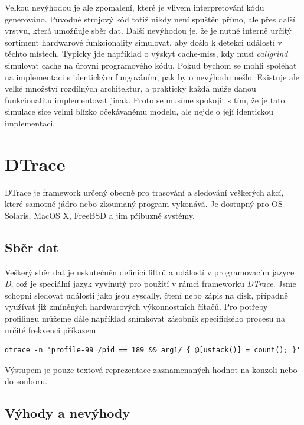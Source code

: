 \documentclass[czech,BP]{thesiskiv}
\begin{document}
Velkou nevýhodou je ale zpomalení, které je vlivem interpretování kódu generováno. Původně strojový kód totiž nikdy není spuštěn přímo, ale přes další vrstvu, která umožňuje sběr dat. Další nevýhodou je, že je nutné interně určitý sortiment hardwarové funkcionality simulovat, aby došlo k detekci událostí v těchto místech. Typicky jde například o výskyt cache-miss, kdy musí \emph{callgrind} simulovat cache na úrovni programového kódu. Pokud bychom se mohli spoléhat na implementaci s identickým fungováním, pak by o nevýhodu nešlo. Existuje ale velké množství rozdílných architektur, a prakticky každá může danou funkcionalitu implementovat jinak. Proto se musíme spokojit s tím, že je tato simulace sice velmi blízko očekávanému modelu, ale nejde o její identickou implementaci.




\section{DTrace}

DTrace je framework určený obecně pro trasování a sledování veškerých akcí, které samotné jádro nebo zkoumaný program vykonává. Je dostupný pro OS Solaris, MacOS X, FreeBSD a jim příbuzné systémy.

\subsection*{Sběr dat}

Veškerý sběr dat je uskutečněn definicí filtrů a událostí v programovacím jazyce \emph{D}, což je speciální jazyk vyvinutý pro použití v rámci frameworku \emph{DTrace}. Jsme schopni sledovat události jako jsou syscally, čtení nebo zápis na disk, případně využívat již zmíněných hardwarových výkonnostních čítačů. Pro potřeby profilingu můžeme dále například snímkovat zásobník specifického procesu na určité frekvenci příkazem

\lstset{escapechar=@,style=custombash}
\begin{lstlisting}
dtrace -n 'profile-99 /pid == 189 && arg1/ { @[ustack()] = count(); }'
\end{lstlisting}

Výstupem je pouze textová reprezentace zaznamenaných hodnot na konzoli nebo do souboru.

\subsection*{Výhody a nevýhody}
\end{document}
